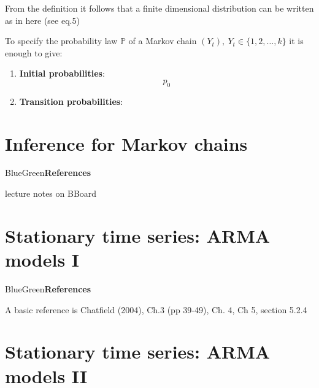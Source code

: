\documentclass[dvipsnames,12pt]{book}
\begin{document}
            \begin{definition}
                
            \end{definition}

            From the definition it follows that a finite dimensional distribution can be written as in here (see eq.5)

            \noindent To specify the probability law \(\mathbb{P}\) of a Markov chain \((Y_t), \ Y_t \in \{ 1,2, \ldots, k \}\) it is enough to give:
                \begin{enumerate}[label=\roman*.]
                    \item \textbf{Initial probabilities}:
                        \[
                        p_0 
                        \]
                    \item \textbf{Transition probabilities}:
                \end{enumerate}

    \chapter{Inference for Markov chains}

            \begin{mybox}{BlueGreen}{\textbf{References}}

                lecture notes on BBoard
                
            \end{mybox}

    \chapter{Stationary time series: ARMA models I}

            \begin{mybox}{BlueGreen}{\textbf{References}}

                A basic reference is Chatfield (2004), Ch.3 (pp 39-49), Ch. 4, Ch 5, section 5.2.4
                
            \end{mybox}

    \chapter{Stationary time series: ARMA models II}

        
        
\end{document}
